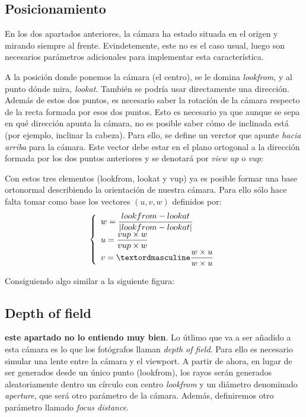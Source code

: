 \subsection{Posicionamiento}

En los dos apartados anteriores, la cámara ha estado situada en el origen y mirando siempre al frente. Evindetemente, este no es el caso usual, luego son necesarios parámetros adicionales para implementar esta característica. 

A la posición donde ponemos la cámara (el centro), se le domina \textit{lookfrom}, y al punto dónde mira, \textit{lookat}. También se podría usar directamente una dirección. Además de estos dos puntos, es necesario saber la rotación de la cámara respecto de la recta formada por esos dos puntos. Esto es necesario ya que aunque se sepa en qué dirección apunta la cámara, no es posible saber cómo de inclinada está (por ejemplo, inclinar la cabeza). Para ello, se define un verctor que apunte \textit{hacia arriba} para la cámara. Este vector debe estar en el plano ortogonal a la dirección formada por los dos puntos anteriores y se denotará por \textit{view up} o \textit{vup}:


Con estos tres elementos (lookfrom, lookat y vup) ya es posible formar una base ortonormal describiendo la orientación de nuestra cámara. Para ello sólo hace falta tomar como base los vectores $(u,v,w)$ definidos por:
\[
\left\{\begin{array}{lll}
w = \displaystyle\frac{lookfrom-lookat}{|lookfrom-lookat|}\\
u = \displaystyle\frac{vup\times w}{vup\times w}\\
v = \displaystyleº\frac{w\times u}{w\times u}\\
\end{array}
\right.
\]

Consiguiendo algo similar a la siguiente figura:


\subsection{Depth of field}

\textbf{este apartado no lo entiendo muy bien}. Lo útlimo que va a ser añadido a esta cámara es lo que los fotógrafos llaman \textit{depth of field}. Para ello es necesario simular una lente entre la cámara y el viewport. A partir de ahora, en lugar de ser generados desde un único punto (lookfrom), los rayos serán generados aleatoriamente dentro un círculo con centro \textit{lookfrom} y un diámetro denominado \textit{aperture}, que será otro parámetro de la cámara. Además, definiremos otro parámetro llamado \textit{focus distance}.

